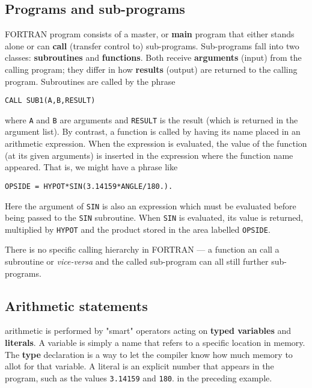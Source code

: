 \subsection{Programs and sub-programs} 
 FORTRAN program consists of a master, or \textbf{main} program that either stands alone or can \textbf{call} (transfer control to) sub-programs. Sub-programs fall into two classes: \textbf{subroutines} and \textbf{functions}. Both receive \textbf{arguments} (input) from the calling program; they differ in how \textbf{results} (output) are returned to the calling program. Subroutines are called by the phrase

\begin{verbatim}
CALL SUB1(A,B,RESULT)
\end{verbatim}

where \verb|A| and \verb|B| are arguments and \verb|RESULT| is the result (which is returned in the argument list). By contrast, a function is called by having its name placed in an arithmetic expression. When the expression is evaluated, the value of the function (at its given arguments) is inserted in the expression where the function name appeared. That is, we might have a phrase like

\begin{verbatim}
OPSIDE = HYPOT*SIN(3.14159*ANGLE/180.).
\end{verbatim}

Here the argument of \verb|SIN| is also an expression which must be evaluated before being passed to the \verb|SIN| subroutine. When \verb|SIN| is evaluated, its value is returned, multiplied by \verb|HYPOT| and the product stored in the area labelled \verb|OPSIDE|.

There is no specific calling hierarchy in FORTRAN — a function an call a subroutine or \textit{vice-versa} and the called sub-program can all still further sub-programs.

\subsection{Arithmetic statements}
 arithmetic is performed by "smart" operators acting on \textbf{typed variables} and \textbf{literals}. A variable is simply a name that refers to a specific location in memory. The \textbf{type} declaration is a way to let the compiler know how much memory to allot for that variable. A literal is an explicit number that appears in the program, such as the values \verb|3.14159| and \verb|180|. in the preceding example.

